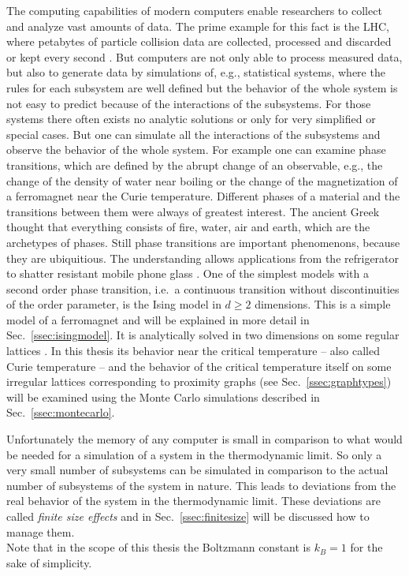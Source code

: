 The computing capabilities of modern computers enable researchers to
collect and analyze vast amounts of data. The prime example for this fact
is the LHC, where petabytes of particle collision data are collected,
processed and discarded or kept every second \cite{LHC}.
But computers are not only able to process measured data, but
also to generate data by simulations of, e.g., statistical systems, where
the rules for each subsystem are well defined but the behavior of the
whole system is not easy to predict because of the interactions of the
subsystems. For those systems there often exists no analytic solutions
or only for very simplified or special cases. But one can simulate all
the interactions of the subsystems and observe the behavior of the whole
system.
For example one can examine phase transitions, which are defined by the abrupt
change of an observable, e.g., the change of the density of water near
boiling or the change of the magnetization of a ferromagnet near the
Curie temperature.
Different phases of a material and the transitions between them were
always of greatest interest. The ancient Greek thought that everything
consists of fire, water, air and earth, which are the archetypes of
phases. Still phase transitions are important phenomenons, because they
are ubiquitious. The understanding allows applications from the
refrigerator to shatter resistant mobile phone glass \cite{PJournalGlass}.
One of the simplest models with a second order
phase transition, i.e.\ a continuous transition without discontinuities of
the order parameter, is the Ising model \cite{Ising1925} in \(d \ge 2\)
dimensions. This is a simple
model of a ferromagnet and will be explained in more detail in Sec.\
\ref{ssec:isingmodel}. It is analytically solved in two dimensions on
some regular lattices \cite{Onsager1944} \cite{Wannier1945}.
In this thesis its behavior near the critical temperature -- also called
Curie temperature -- and the behavior of the critical temperature itself
on some irregular lattices corresponding to proximity graphs
(see Sec.\ \ref{ssec:graphtypes}) will be examined using the Monte
Carlo simulations described in Sec.\ \ref{ssec:montecarlo}.

Unfortunately the memory of any computer is small in comparison to what
would be needed for a simulation of a system in the
thermodynamic limit. So only a very small number of subsystems can be
simulated in comparison to the actual number of subsystems
of the system in nature. This leads to deviations from the real behavior
of the system in the thermodynamic limit. These deviations are called
\emph{finite size effects} and in Sec.\ \ref{ssec:finitesize} will be
discussed how to manage them.\\

Note that in the scope of this thesis the Boltzmann constant is \(k_{B}=1\)
for the sake of simplicity.
